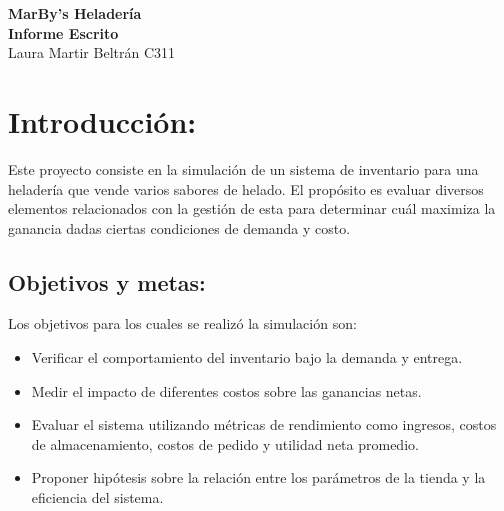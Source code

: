 \documentclass[12pt,a4paper]{article}
\author{Laura Martir Beltrán}
\begin{document}
\begin{flushleft}
{\LARGE \textbf{MarBy's Heladería}} \\\vspace{0.3cm}
\textbf{Informe Escrito}\\
Laura Martir Beltrán C311

\section*{Introducción:}
\noindent Este proyecto consiste en la simulación de un sistema de inventario para una heladería que vende varios sabores de helado. El propósito es evaluar diversos elementos relacionados con la gestión de esta para determinar cuál maximiza la ganancia dadas ciertas condiciones de demanda y costo.

\subsection*{Objetivos y metas:}
Los objetivos para los cuales se realizó la simulación son:
\begin{itemize}
\item Verificar el comportamiento del inventario bajo la demanda y entrega.
\item Medir el impacto de diferentes costos sobre las ganancias netas.
\item Evaluar el sistema utilizando métricas de rendimiento como ingresos, costos de almacenamiento, costos de pedido y utilidad neta promedio.
\item Proponer hipótesis sobre la relación entre los parámetros de la tienda y la eficiencia del sistema.
\end{itemize}


\end{flushleft}
\end{document}
